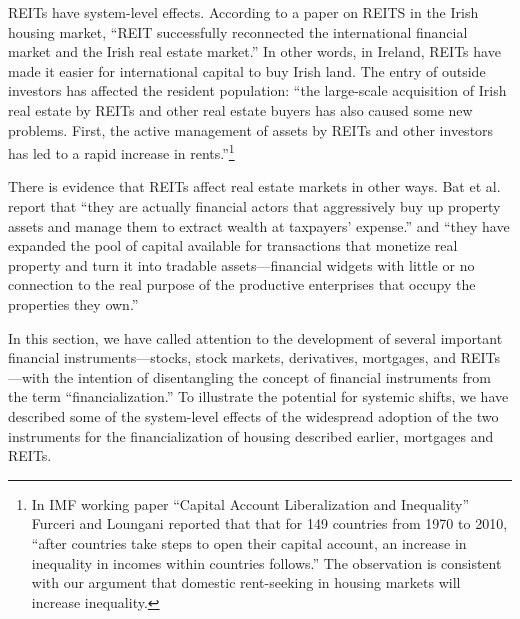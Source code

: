 REITs have system-level effects. %
According to a paper \cite{wangAnalyzeImpactREITs2021} on REITS in the Irish housing market, ``REIT successfully reconnected the international financial market and the Irish real estate market.'' In other words, in Ireland, REITs have made it easier for international capital to buy Irish land. The entry of outside investors %
has affected the resident population:  ``the large-scale acquisition of Irish real estate by REITs and other real estate buyers has also caused some new problems. First, the active management of assets by REITs and other investors has led to a rapid increase in rents.''\cite{wangAnalyzeImpactREITs2021}\footnote{In  IMF working paper ``Capital Account Liberalization and Inequality'' \cite{furceriCapitalAccountLiberalization2015}  Furceri and Loungani reported that that for 149 countries from 1970 to 2010, ``after countries take steps to open their capital account, an increase in inequality in incomes within countries follows.'' The observation is consistent with our argument that domestic \gls{rent-seeking} in housing markets will increase inequality.}  

There is evidence that REITs affect real estate markets in other ways. Bat et al.  \cite{batRolePublicREITs2022} report that  ``they are actually financial actors that aggressively buy up property assets and manage them to extract wealth at taxpayers' expense.'' and ``they have expanded the pool of capital available for transactions that monetize real property and turn it into tradable assets---financial widgets with little or no connection to the real purpose of the productive enterprises that occupy the properties they own.''

In this section, we have called attention to the development of several important financial instruments---stocks, stock markets, derivatives, mortgages, and REITs---with the intention of disentangling the concept of financial instruments from the term ``financialization.'' %
To illustrate the potential for systemic shifts, we have described some of the system-level effects of the widespread adoption of the two instruments for the financialization of housing described earlier, mortgages and REITs. %

